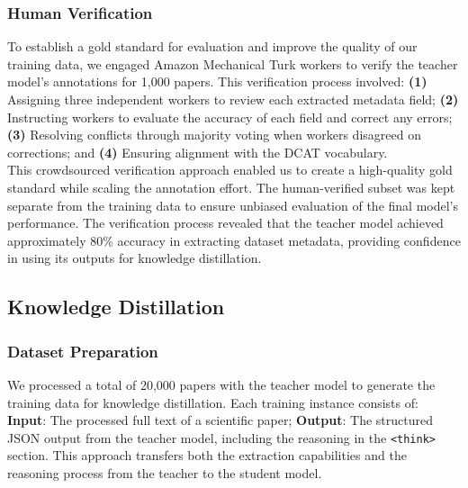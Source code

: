 \documentclass[runningheads]{llncs}
\begin{document}
\subsubsection{Human Verification}
To establish a gold standard for evaluation and improve the quality of our training data, we engaged Amazon Mechanical Turk workers to verify the teacher model's annotations for 1,000 papers. This verification process involved:
     \textbf{(1)} Assigning three independent workers to review each extracted metadata field;
     \textbf{(2)} Instructing workers to evaluate the accuracy of each field and correct any errors;
     \textbf{(3)} Resolving conflicts through majority voting when workers disagreed on corrections; and
     \textbf{(4)} Ensuring alignment with the DCAT vocabulary. %
\\
\noindent
This crowdsourced verification approach enabled us to create a high-quality gold standard while scaling the annotation effort. The human-verified subset was kept separate from the training data to ensure unbiased evaluation of the final model's performance. The verification process revealed that the teacher model achieved approximately 80\% accuracy in extracting dataset metadata, providing confidence in using its outputs for knowledge distillation.

\subsection{Knowledge Distillation}
\subsubsection{Dataset Preparation}
We processed a total of 20,000 papers with the teacher model to generate the training data for knowledge distillation. Each training instance consists of:
    \textbf{Input}: The processed full text of a scientific paper;
     \textbf{Output}: The structured JSON output from the teacher model, including the reasoning in the \texttt{<think>} section.
This approach transfers both the extraction capabilities and the reasoning process from the teacher to the student model.
\end{document}
